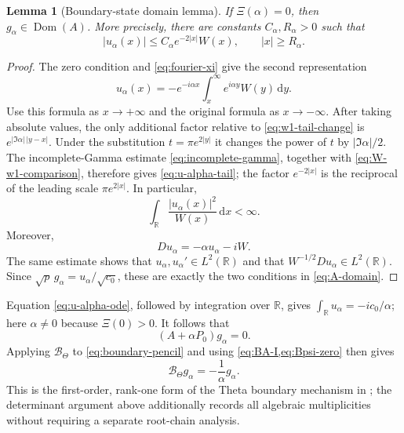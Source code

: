 \documentclass[11pt,reqno]{amsart}
\numberwithin{equation}{section}
\newtheorem{lemma}[lemma]{Lemma}
\newcommand{\R}{\mathbb R}
\newcommand{\1}{\mathbf 1}
\newcommand{\BTheta}{\mathcal B_{\Theta}}
\newcommand{\Dom}{\operatorname{Dom}}
\newcommand{\dd}{\,\mathrm d}
\begin{document}
\begin{lemma}[Boundary-state domain lemma]\label{lem:boundary-domain}
If $\Xi(\alpha)=0$, then $g_\alpha\in\Dom(A)$.  More precisely, there are
constants $C_\alpha,R_\alpha>0$ such that
\begin{equation}\label{eq:u-alpha-tail}
 |u_\alpha(x)|\leq C_\alpha e^{-2|x|}W(x),
 \qquad |x|\geq R_\alpha.
\end{equation}
\end{lemma}

\begin{proof}
The zero condition and \cref{eq:fourier-xi} give the second representation
\[
 u_\alpha(x)=-e^{-i\alpha x}
 \int_x^\infty e^{i\alpha y}W(y)\dd y.
\]
Use this formula as $x\to+\infty$ and the original formula as
$x\to-\infty$.  After taking absolute values, the only additional factor
relative to \eqref{eq:w1-tail-change} is
$e^{|\Im\alpha|\,|y-x|}$.  Under the substitution
$t=\pi e^{2|y|}$ it changes the power of $t$ by
$|\Im\alpha|/2$.  The incomplete-Gamma estimate
\eqref{eq:incomplete-gamma}, together with
\eqref{eq:W-w1-comparison}, therefore gives \eqref{eq:u-alpha-tail}; the
factor $e^{-2|x|}$ is the reciprocal of the leading scale
$\pi e^{2|x|}$.  In particular,
\[
 \int_\R\frac{|u_\alpha(x)|^2}{W(x)}\dd x<\infty.
\]
Moreover,
\begin{equation}\label{eq:u-alpha-ode}
 Du_\alpha=-\alpha u_\alpha-iW.
\end{equation}
The same estimate shows that $u_\alpha,u_\alpha'\in L^2(\R)$ and that
$W^{-1/2}Du_\alpha\in L^2(\R)$.  Since
$\sqrt p\,g_\alpha=u_\alpha/\sqrt{c_0}$, these are exactly the two
conditions in \eqref{eq:A-domain}.
\end{proof}

Equation \eqref{eq:u-alpha-ode}, followed by integration over $\R$, gives
$\int_\R u_\alpha=-ic_0/\alpha$; here $\alpha\neq0$ because
$\Xi(0)>0$.  It follows that
\begin{equation}\label{eq:boundary-pencil}
 (A+\alpha P_0)g_\alpha=0.
\end{equation}
Applying $\BTheta$ to \eqref{eq:boundary-pencil} and using
\cref{eq:BA-I,eq:Bpsi-zero} then gives
\begin{equation}\label{eq:boundary-eigenstate}
 \BTheta g_\alpha=-\frac1\alpha g_\alpha.
\end{equation}
This is the first-order, rank-one form of the Theta boundary mechanism in
\cite{Hedenmalm2026}; the determinant argument above additionally records all
algebraic multiplicities without requiring a separate root-chain analysis.
\end{document}
